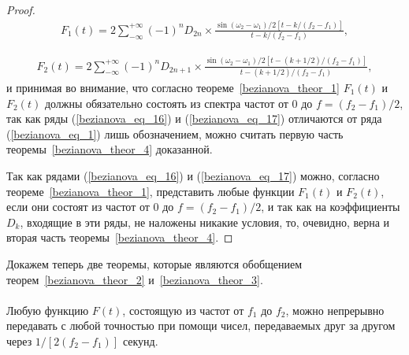 \begin{proof}
\begin{equation}\label{bezianova_eq_16}
\begin{gathered}
 F_1(t)=2 \sum_{-\infty}^{+\infty}(-1)^n D_{2 n} \times \frac{\sin \left(\omega_2-\omega_1\right) / 2\left[t-k /\left(f_2-f_1\right)\right]}{t-k /\left(f_2-f_1\right)}, 
\end{gathered}
\end{equation}

\begin{equation}\label{bezianova_eq_17}
\begin{gathered}
F_2(t)=2 \sum_{-\infty}^{+\infty}(-1)^n D_{2 n+1} \times \frac{\sin \left(\omega_2-\omega_1\right) / 2\left[t-(k+1 / 2) /\left(f_2-f_1\right)\right]}{t-(k+1 / 2) /\left(f_2-f_1\right)}, 
\end{gathered}
\end{equation}
и принимая во внимание, что согласно теореме~\ref{bezianova_theor_1} $F_1(t)$ и $F_2(t)$ должны обязательно состоять из спектра частот от 0 до $f=\left(f_2-f_1\right) / 2$, так как ряды (\ref{bezianova_eq_16}) и (\ref{bezianova_eq_17}) отличаются от ряда (\ref{bezianova_eq_1}) лишь обозначением, можно считать первую часть теоремы~\ref{bezianova_theor_4} доказанной.

Так как рядами (\ref{bezianova_eq_16}) и (\ref{bezianova_eq_17}) можно, согласно теореме~\ref{bezianova_theor_1}, представить любые функции $F_1(t)$ и $F_2(t)$, если они состоят из частот от 0 до $f=\left(f_2-f_1\right) / 2$, и так как на коэффициенты $D_k$, входящие в эти ряды, не наложены никакие условия, то, очевидно, верна и вторая часть теоремы~\ref{bezianova_theor_4}.
\end{proof}

Докажем теперь две теоремы, которые являются обобщением теорем~\ref{bezianova_theor_2} и~\ref{bezianova_theor_3}.
\paragraph{}

\begin{theorem}\label{bezianova_theor_5} Любую функцию $F(t)$, состоящую из частот от $f_1$ до $f_2$, можно непрерывно передавать с любой точностью при помощи чисел, передаваемых друг за другом через $1 /\left[2\left(f_2-f_1\right)\right]$ секунд.
	\end{theorem}

